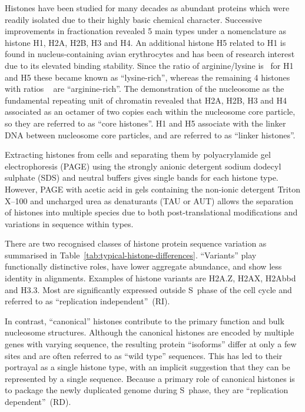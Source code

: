 \documentclass[10pt,a4paper,draft,article]{memoir}
\begin{document}
    Histones have been studied for many decades as abundant proteins which were readily
    isolated due to their highly basic chemical character. Successive improvements in
    fractionation revealed 5 main types under a nomenclature as histone H1, H2A, H2B, H3
    and H4\citep{nomenclature}.  %
    An additional histone H5 related to H1 is found in nucleus-containing avian
    erythrocytes and has been of research interest due to its elevated binding stability.
    Since the ratio of arginine/lysine is \HOneArgLysRatio\ for H1 and H5 these became known as
    ``lysine-rich'', whereas the remaining 4 histones with ratios \OthersArgLysRatio\  are ``arginine-rich''.
    The demonstration of the nucleosome as the fundamental repeating unit of chromatin revealed
    that H2A, H2B, H3 and H4 associated as an octamer of two copies each within the
    nucleosome core particle, so they are referred to as ``core histones''. H1 and H5
    associate with the linker DNA between nucleosome core particles, and are referred to
    as ``linker histones''.

    Extracting histones from cells and separating them by polyacrylamide gel electrophoresis
    (PAGE) using the strongly anionic detergent sodium dodecyl sulphate (SDS) and neutral
    buffers gives single bands for each histone type. However, PAGE with acetic acid in gels
    containing the non-ionic detergent Triton X--100 and uncharged urea as denaturants
    (TAU or AUT) allows the separation of histones into multiple species due to both
    post-translational modifications and variations in sequence within types.

    There are two recognised classes of histone protein sequence variation as summarised in
    Table~\ref{tab:typical-histone-differences}. ``Variants'' play functionally distinctive
    roles, have lower aggregate abundance,
    and show less identity in alignments. Examples of histone variants are H2A.Z, H2AX, H2Abbd
    and H3.3. Most are significantly expressed outside S~phase of the cell cycle and referred
    to as ``replication independent''~(RI).

    In contrast, ``canonical'' histones contribute to the primary function and bulk nucleosome
    structures. Although the canonical histones are encoded by multiple genes with varying
    sequence, the resulting protein ``isoforms'' differ at only a few sites and are often
    referred to as ``wild type'' sequences. This has led to their portrayal as a single histone
    type, with an implicit suggestion that they can be represented by a single sequence. Because
    a primary role of canonical histones is to package the newly duplicated genome during
    S~phase, they are ``replication dependent''~(RD).
\end{document}
